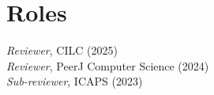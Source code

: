 \section{\sc Roles}

\emph{Reviewer}, CILC (2025)\\
\emph{Reviewer}, PeerJ Computer Science (2024)\\
\emph{Sub-reviewer}, ICAPS (2023)


